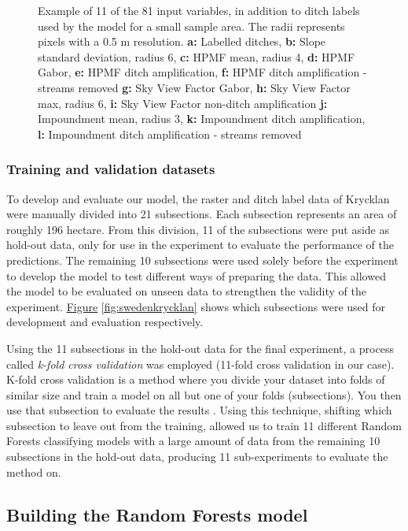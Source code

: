 \documentclass[]{interact}
\theoremstyle{plain}%
\theoremstyle{definition}
\theoremstyle{remark}
\begin{document}
\begin{figure} [!htb]
    \caption{Example of 11 of the 81 input variables, in addition to ditch labels used by the model for a small sample area. The radii represents pixels with a 0.5 m resolution. \newline \textbf{a:} Labelled ditches, \textbf{b:} Slope standard deviation, radius 6, \textbf{c:} HPMF mean, radius 4, \textbf{d:} HPMF Gabor, \textbf{e:} HPMF ditch amplification, \textbf{f:} HPMF ditch amplification - streams removed \textbf{g:} Sky View Factor Gabor, \textbf{h:} Sky View Factor max, radius 6, \textbf{i:} Sky View Factor non-ditch amplification  \textbf{j:} Impoundment mean, radius 3, \textbf{k:} Impoundment ditch amplification, \textbf{l:} Impoundment ditch amplification - streams removed}
    \label{fig:features}
\end{figure}
\clearpage

\subsubsection{Training and validation datasets}
\label{trainingvalidationdatasets}
To develop and evaluate our model, the raster and ditch label data of Krycklan were manually divided into 21 subsections.  Each subsection represents an area of roughly 196 hectare. From this division, 11 of the subsections were put aside as hold-out data, only for use in the experiment to evaluate the performance of the predictions. The remaining 10 subsections were used solely before the experiment to develop the model to test different ways of preparing the data. This allowed the model to be evaluated on unseen data to strengthen the validity of the experiment. \hyperref[fig:swedenkrycklan]{Figure} \ref{fig:swedenkrycklan} shows which subsections were used for development and evaluation respectively.

Using the 11 subsections in the hold-out data for the final experiment, a process called \textit{k-fold cross validation} was employed (11-fold cross validation in our case). K-fold cross validation is a method where you divide your dataset into folds of similar size and train a model on all but one of your folds (subsections). You then use that subsection to evaluate the results \citep{crossvalidation}. Using this technique, shifting which subsection to leave out from the training, allowed us to train 11 different Random Forests classifying models with a large amount of data from the remaining 10 subsections in the hold-out data, producing 11 sub-experiments to evaluate the method on.

\subsection{Building the Random Forests model}
\end{document}
